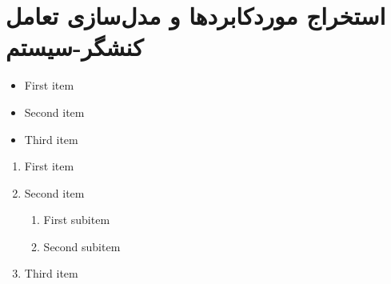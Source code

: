 \documentclass[12pt]{article}
\begin{document}
	\newpage
	\section{استخراج موردکابردها و مدل‌سازی تعامل کنشگر-سیستم}

	\begin{itemize}
		\item First item
		\item Second item
		\item Third item
	\end{itemize}

	\begin{enumerate}
		\renewcommand{\labelenumi}{.R\arabic{enumi}}
		\item First item
		\item Second item
		\begin{enumerate}
			\renewcommand{\labelenumii}{.R\arabic{enumi}.\arabic{enumii}}
			\item First subitem
			\item Second subitem
		\end{enumerate}
		\item Third item
	\end{enumerate}
\end{document}
